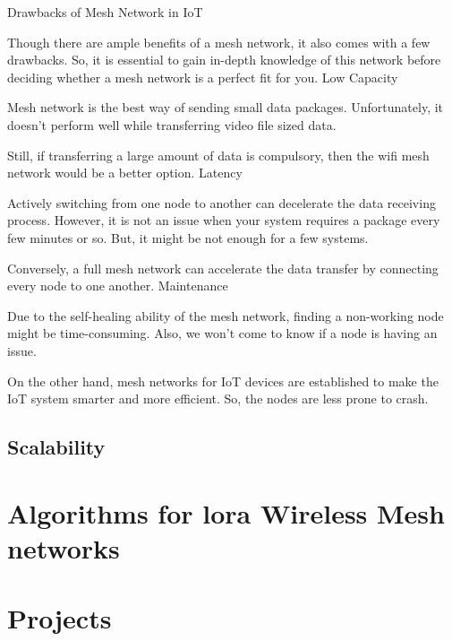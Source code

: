 			Drawbacks of Mesh Network in IoT
			
			Though there are ample benefits of a mesh network, it also comes with a few drawbacks. So, it is essential to gain in-depth knowledge of this network before deciding whether a mesh network is a perfect fit for you.
			Low Capacity
			
			Mesh network is the best way of sending small data packages. Unfortunately, it doesn’t perform well while transferring video file sized data.
			
			Still, if transferring a large amount of data is compulsory, then the wifi mesh network would be a better option.
			Latency
			
			Actively switching from one node to another can decelerate the data receiving process. However, it is not an issue when your system requires a package every few minutes or so. But, it might be not enough for a few systems.
			
			Conversely, a full mesh network can accelerate the data transfer by connecting every node to one another.
			Maintenance
			
			Due to the self-healing ability of the mesh network, finding a non-working node might be time-consuming. Also, we won’t come to know if a node is having an issue.
			
			On the other hand, mesh networks for IoT devices are established to make the IoT system smarter and more efficient. So, the nodes are less prone to crash.
	
		\subsection{Scalability}
		
			
			
	
	\section{Algorithms for lora Wireless Mesh networks}
	
	
	\section{Projects}\label{sec:chap4_projects}
		
